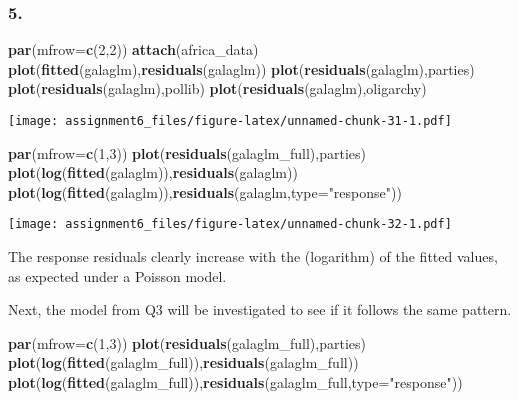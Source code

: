 \documentclass[11pt,]{article}
\newenvironment{Shaded}{\begin{snugshade}}{\end{snugshade}}
\newcommand{\KeywordTok}[1]{\textcolor[rgb]{0.13,0.29,0.53}{\textbf{{#1}}}}
\newcommand{\DataTypeTok}[1]{\textcolor[rgb]{0.13,0.29,0.53}{{#1}}}
\newcommand{\DecValTok}[1]{\textcolor[rgb]{0.00,0.00,0.81}{{#1}}}
\newcommand{\StringTok}[1]{\textcolor[rgb]{0.31,0.60,0.02}{{#1}}}
\newcommand{\NormalTok}[1]{{#1}}
\begin{document}
\subsubsection{5.}\label{section-19}

\begin{Shaded}
\begin{Highlighting}[]
\KeywordTok{par}\NormalTok{(}\DataTypeTok{mfrow=}\KeywordTok{c}\NormalTok{(}\DecValTok{2}\NormalTok{,}\DecValTok{2}\NormalTok{))}
\KeywordTok{attach}\NormalTok{(africa_data)}
\KeywordTok{plot}\NormalTok{(}\KeywordTok{fitted}\NormalTok{(galaglm),}\KeywordTok{residuals}\NormalTok{(galaglm))}
\KeywordTok{plot}\NormalTok{(}\KeywordTok{residuals}\NormalTok{(galaglm),parties)}
\KeywordTok{plot}\NormalTok{(}\KeywordTok{residuals}\NormalTok{(galaglm),pollib)}
\KeywordTok{plot}\NormalTok{(}\KeywordTok{residuals}\NormalTok{(galaglm),oligarchy)}
\end{Highlighting}
\end{Shaded}

\texttt{[image: assignment6\_files/figure-latex/unnamed-chunk-31-1.pdf]}

\begin{Shaded}
\begin{Highlighting}[]
\KeywordTok{par}\NormalTok{(}\DataTypeTok{mfrow=}\KeywordTok{c}\NormalTok{(}\DecValTok{1}\NormalTok{,}\DecValTok{3}\NormalTok{))}
\KeywordTok{plot}\NormalTok{(}\KeywordTok{residuals}\NormalTok{(galaglm_full),parties)}
\KeywordTok{plot}\NormalTok{(}\KeywordTok{log}\NormalTok{(}\KeywordTok{fitted}\NormalTok{(galaglm)),}\KeywordTok{residuals}\NormalTok{(galaglm))}
\KeywordTok{plot}\NormalTok{(}\KeywordTok{log}\NormalTok{(}\KeywordTok{fitted}\NormalTok{(galaglm)),}\KeywordTok{residuals}\NormalTok{(galaglm,}\DataTypeTok{type=}\StringTok{"response"}\NormalTok{))}
\end{Highlighting}
\end{Shaded}

\texttt{[image: assignment6\_files/figure-latex/unnamed-chunk-32-1.pdf]}

The response residuals clearly increase with the (logarithm) of the
fitted values, as expected under a Poisson model.

Next, the model from Q3 will be investigated to see if it follows the
same pattern.

\begin{Shaded}
\begin{Highlighting}[]
\KeywordTok{par}\NormalTok{(}\DataTypeTok{mfrow=}\KeywordTok{c}\NormalTok{(}\DecValTok{1}\NormalTok{,}\DecValTok{3}\NormalTok{))}
\KeywordTok{plot}\NormalTok{(}\KeywordTok{residuals}\NormalTok{(galaglm_full),parties)}
\KeywordTok{plot}\NormalTok{(}\KeywordTok{log}\NormalTok{(}\KeywordTok{fitted}\NormalTok{(galaglm_full)),}\KeywordTok{residuals}\NormalTok{(galaglm_full))}
\KeywordTok{plot}\NormalTok{(}\KeywordTok{log}\NormalTok{(}\KeywordTok{fitted}\NormalTok{(galaglm_full)),}\KeywordTok{residuals}\NormalTok{(galaglm_full,}\DataTypeTok{type=}\StringTok{"response"}\NormalTok{))}
\end{Highlighting}
\end{Shaded}
\end{document}
